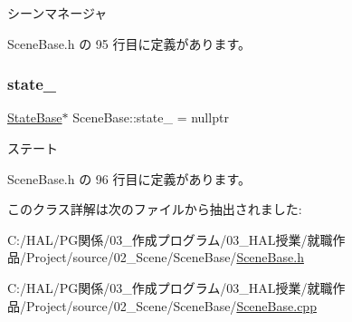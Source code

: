 シーンマネージャ 



 Scene\+Base.\+h の 95 行目に定義があります。

\mbox{\label{class_scene_base_a9d8b7237f492e9ce0724714393b0e881}} 
\subsubsection{\texorpdfstring{state\+\_\+}{state\_}}
{\footnotesize\ttfamily \mbox{\hyperlink{class_scene_base_1_1_state_base}{State\+Base}}$\ast$ Scene\+Base\+::state\+\_\+ = nullptr\hspace{0.3cm}{\ttfamily [private]}}



ステート 



 Scene\+Base.\+h の 96 行目に定義があります。



このクラス詳解は次のファイルから抽出されました\+:\begin{DoxyCompactItemize}
\item 
C\+:/\+H\+A\+L/\+P\+G関係/03\+\_\+作成プログラム/03\+\_\+\+H\+A\+L授業/就職作品/\+Project/source/02\+\_\+\+Scene/\+Scene\+Base/\mbox{\hyperlink{_scene_base_8h}{Scene\+Base.\+h}}\item 
C\+:/\+H\+A\+L/\+P\+G関係/03\+\_\+作成プログラム/03\+\_\+\+H\+A\+L授業/就職作品/\+Project/source/02\+\_\+\+Scene/\+Scene\+Base/\mbox{\hyperlink{_scene_base_8cpp}{Scene\+Base.\+cpp}}\end{DoxyCompactItemize}
